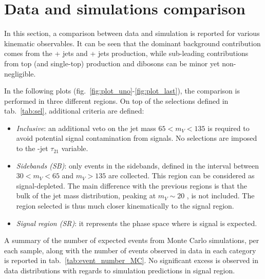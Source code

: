 \section{Data and simulations comparison}
\label{sec:datamc_comp}

In this section, a comparison between data and simulation is reported for various kinematic observables. It can be seen that the dominant background contribution comes from the \Z + jets and \W + jets production, while sub-leading contributions from top (\ttbar and single-top) production and dibosons can be minor yet non-negligible.

\noindent In the following plots (fig.~\ref{fig:plot_uno}-\ref{fig:plot_last}), the comparison is performed in three different regions. On top of the selections defined in tab.~\ref{tab:sel}, additional criteria are defined:
\begin{itemize}
  \item \textit{Inclusive}: an additional veto on the jet mass $65 < m_V < 135$ \GeV is required to avoid potential signal contamination from \VZ signals. No selections are imposed to the \V-jet $\tau_{21}$ variable.
  \item \textit{Sidebands (SB)}: only events in the sidebands, defined in the interval between $30 < m_V < 65$ \GeV and $m_V > 135$ \GeV are collected. This region can be considered as signal-depleted. The main difference with the previous regions is that the bulk of the jet mass distribution, peaking at $m_V \sim 20$ \GeV, is not included. The region selected is thus much closer kinematically to the signal region.
  \item \textit{Signal region (SR)}: it represents the phase space where is signal is expected. %
\end{itemize}

\noindent A summary of the number of expected events from Monte Carlo simulations, per each sample, along with the number of events observed in data in each category is reported in tab.~\ref{tab:event_number_MC}. No significant excess is observed in data distributions with regards to simulation predictions in signal region.

